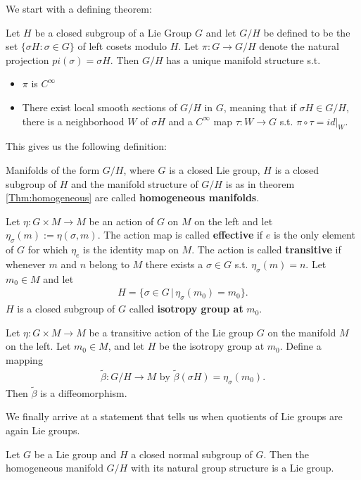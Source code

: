 We start with a defining theorem:
\begin{theorem}\label{Thm:homogeneous}
Let $H$ be a closed subgroup of a Lie Group $G$ and let $G/H$ be defined to be the set $\{\sigma H \colon \sigma \in G\}$ of left cosets modulo $H$. Let $\pi \colon G \to G/H$ denote the natural projection $pi(\sigma) = \sigma H$. Then $G/H$ has a unique manifold structure s.t.
\begin{itemize}
\item $\pi$ is $C^{\infty}$
\item There exist local smooth sections of $G/H$ in $G$, meaning that if $\sigma H \in G/H$, there is a neighborhood $W$ of $\sigma H$ and a $C^{\infty}$ map $\tau \colon W \to G$ s.t. $\pi \circ \tau = id\vert_W$.
\end{itemize}
\end{theorem}
This gives us the following definition:
\begin{definition}
Manifolds of the form $G/H$, where $G$ is a closed Lie group, $H$ is a closed subgroup of $H$ and the manifold structure of $G/H$ is as in theorem \ref{Thm:homogeneous} are called \textbf{homogeneous manifolds}.
\end{definition}
\begin{definition}
Let $\eta \colon G \times M \to M$ be an action of $G$ on $M$ on the left and let $\eta_{\sigma}(m) := \eta(\sigma,m)$. The action map is called \textbf{effective} if $e$ is the only element of $G$ for which $\eta_e$ is the identity map on $M$. The action is called \textbf{transitive} if whenever $m$ and $n$ belong to $M$ there exists a $\sigma \in G$ s.t. $\eta_{\sigma}(m) = n$. Let $m_0 \in M$ and let 
\begin{align*}
H = \{\sigma \in G \, \vert \, \eta_{\sigma}(m_0) = m_0\}.
\end{align*}
$H$ is a closed subgroup of $G$ called \textbf{isotropy group at} $m_0$.
\end{definition}
\begin{theorem}
Let $\eta \colon G \times M \to M$ be a transitive action of the Lie group $G$ on the manifold $M$ on the left. Let $m_0 \in M$, and let $H$ be the isotropy group at $m_0$. Define a mapping
\begin{align*}
\tilde{\beta} \colon G/H \to M \text{ by } \tilde{\beta}(\sigma H) = \eta_{\sigma}(m_0).
\end{align*}
Then $\tilde{\beta}$ is a diffeomorphism.
\end{theorem}
We finally arrive at a statement that tells us when quotients of Lie groups are again Lie groups.
\begin{theorem}
Let $G$ be a Lie group and $H$ a closed normal subgroup of $G$. Then the homogeneous manifold $G/H$ with its natural group structure is a Lie group.
\end{theorem}
